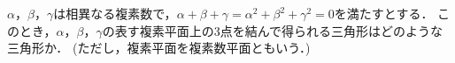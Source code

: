 \documentclass[../../main.tex]{subfiles}
\begin{document}
$\alpha$，$\beta$，$\gamma$は相異なる複素数で，$\alpha+\beta+\gamma={\alpha}^2+{\beta}^2+{\gamma}^2=0$を満たすとする．
このとき，$\alpha$，$\beta$，$\gamma$の表す複素平面上の3点を結んで得られる三角形はどのような三角形か．
(ただし，複素平面を複素数平面ともいう．)
\end{document}
